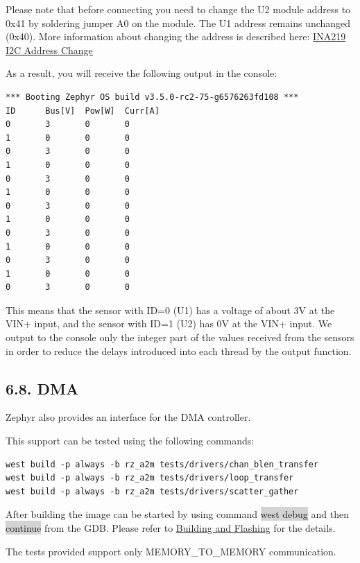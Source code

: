 \documentclass[11pt,a4paper,oneside]{article}
\begin{document}
Please note that before connecting you need to change the U2 module address to 0x41
by soldering jumper A0 on the module. The U1 address remains unchanged (0x40).
More information about changing the address is described here:
\href{https://whatibroke.com/2019/08/10/change-i2c-address-of-ina219/}{INA219 I2C Address Change}

As a result, you will receive the following output in the console:

\begin{lstlisting}
*** Booting Zephyr OS build v3.5.0-rc2-75-g6576263fd108 ***
ID      Bus[V]  Pow[W]  Curr[A]
0       3       0       0
1       0       0       0
0       3       0       0
1       0       0       0
0       3       0       0
1       0       0       0
0       3       0       0
1       0       0       0
0       3       0       0
1       0       0       0
0       3       0       0
1       0       0       0
0       3       0       0
\end{lstlisting}

This means that the sensor with ID=0 (U1) has a voltage of about 3V at the VIN+ input,
and the sensor with ID=1 (U2) has 0V at the VIN+ input. We output to the console only the
integer part of the values received from the sensors in order to reduce the delays
introduced into each thread by the output function.

\subsection*{6.8. DMA}\label{dma}

Zephyr also provides an interface for the DMA controller.

This support can be tested using the following commands:

\begin{lstlisting}
west build -p always -b rz_a2m tests/drivers/chan_blen_transfer
west build -p always -b rz_a2m tests/drivers/loop_transfer
west build -p always -b rz_a2m tests/drivers/scatter_gather
\end{lstlisting}

After building the image can be started by using command \colorbox{lightgray}{west debug}
and then \colorbox{lightgray}{continue} from the GDB. Please refer to
\hyperref[building-and-flashing]{Building and Flashing} for the
details.

The tests provided support only MEMORY\_TO\_MEMORY communication.
\end{document}
